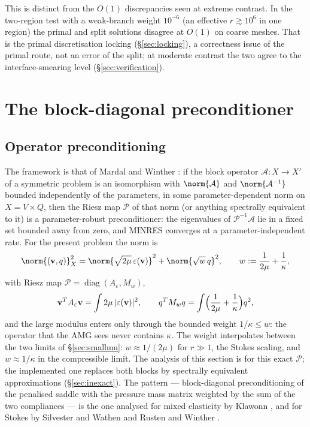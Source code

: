 \documentclass[11pt]{article}
\numberwithin{equation}{section}
\theoremstyle{remark}
\newcommand{\eps}{\varepsilon}
\newcommand{\vv}{\mathbf{v}}
\newcommand{\Ae}{A_{\eps}}
\newcommand{\Mw}{M_{w}}
\begin{document}
This is distinct from the $O(1)$ discrepancies seen at extreme contrast.
In the two-region test with a weak-branch weight $10^{-6}$ (an effective
$r\gtrsim10^6$ in one region) the primal and split solutions disagree at
$O(1)$ on coarse meshes. That is the primal discretisation locking
(\S\ref{sec:locking}), a correctness issue of the primal route, not an
error of the split; at moderate contrast the two agree to the
interface-smearing level (\S\ref{sec:verification}).

\section{The block-diagonal preconditioner}
\label{sec:prec}

\subsection{Operator preconditioning}

The framework is that of Mardal and Winther \cite{MardalWinther2011}: if
the block operator $\mathcal A:X\to X'$ of a symmetric problem is an
isomorphism with $\norm{\mathcal A}$ and $\norm{\mathcal A^{-1}}$ bounded
independently of the parameters, in some parameter-dependent norm on $X =
V\times Q$, then the Riesz map $\mathcal P$ of that norm (or anything
spectrally equivalent to it) is a parameter-robust preconditioner:
the eigenvalues of $\mathcal P^{-1}\mathcal A$ lie in a fixed set bounded
away from zero, and MINRES \cite{PaigeSaunders1975} converges at a
parameter-independent rate. For the present problem the norm is
\begin{equation}
  \norm{(\vv,q)}_X^2 = \norm{\sqrt{2\mu}\,\eps(\vv)}^2
   + \norm{\sqrt{w}\,q}^2,
  \qquad
  w := \frac{1}{2\mu} + \frac{1}{\kappa},
  \label{eq:Xnorm}
\end{equation}
with Riesz map $\mathcal P = \operatorname{diag}(\Ae, \Mw)$,
\begin{equation}
  \vv^T\Ae\vv = \int 2\mu\,|\eps(\vv)|^2,
  \qquad
  q^T\Mw q = \int\Bigl(\frac{1}{2\mu} + \frac{1}{\kappa}\Bigr)q^2 ,
\end{equation}
and the large modulus enters only through the bounded weight
$1/\kappa\le w$: the operator that the AMG sees never contains $\kappa$. The weight interpolates between the two limits of
\S\ref{sec:smallmu}: $w\approx1/(2\mu)$ for $r\gg1$, the Stokes scaling,
and $w\approx1/\kappa$ in the compressible limit. The analysis of this
section is for this exact $\mathcal P$; the implemented one replaces both
blocks by spectrally equivalent approximations (\S\ref{sec:inexact}). The
pattern --- block-diagonal preconditioning of the penalised saddle with
the pressure mass matrix weighted by the sum of the two compliances --- is
the one analysed for mixed elasticity by Klawonn \cite{Klawonn1998}, and
for Stokes by Silvester and Wathen \cite{SilvesterWathen1994} and Rusten
and Winther \cite{RustenWinther1992}.
\end{document}
